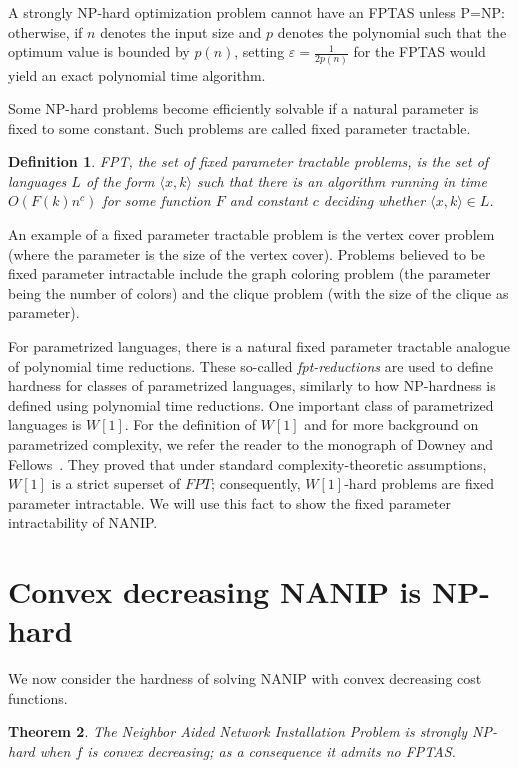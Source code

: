 \documentclass[english]{llncs}
\newtheorem{thm}{Theorem}
\newtheorem{defn}[thm]{Definition}
\begin{document}
A strongly NP-hard optimization problem cannot have an FPTAS unless
P=NP: otherwise, if $n$ denotes the input size and $p$ denotes the polynomial
such that the optimum value is bounded by $p(n)$, setting
$\varepsilon=\frac{1}{2p(n)}$ for the FPTAS would yield an exact polynomial
time algorithm.

Some NP-hard problems become efficiently solvable if a natural parameter is
fixed to some constant. Such problems are called fixed parameter tractable.

\begin{defn}
FPT, the set of \emph{fixed parameter tractable} problems, is the set
of languages $L$ of the form $\langle x,k\rangle$
such that there is an algorithm running in time $O(F(k) n^c)$ for some function
$F$ and constant $c$ deciding whether $\langle x,k\rangle\in L$.
\end{defn}

An example of a fixed parameter tractable problem is the vertex cover problem
(where the parameter is the size of the vertex cover). 
Problems believed to be fixed parameter intractable include the graph coloring problem
(the parameter being the number of colors) and the clique problem (with the size of 
the clique as parameter).

For parametrized languages, there is a natural fixed parameter tractable analogue of polynomial time reductions.
These so-called \emph{fpt-reductions} are used to define hardness for classes of parametrized languages,
similarly to how NP-hardness is defined using polynomial time reductions.
One important class of parametrized languages is $W[1]$. For the definition of $W[1]$ and for more background
on parametrized complexity, we refer the reader to the monograph of Downey and Fellows~\cite{DowneyF13}.
They proved that under standard complexity-theoretic assumptions, $W[1]$ is a strict superset of
$FPT$; consequently, $W[1]$-hard problems are fixed parameter intractable.
We will use this fact to show the fixed parameter intractability of NANIP.


\section{Convex decreasing NANIP is NP-hard} \label{sec:computation} We now
consider the hardness of solving NANIP with convex decreasing cost functions.

\begin{thm} \label{thm:np-hard} The Neighbor Aided Network Installation Problem
is strongly NP-hard when $f$ is convex decreasing; as a consequence it admits
no FPTAS. \end{thm}
\end{document}
